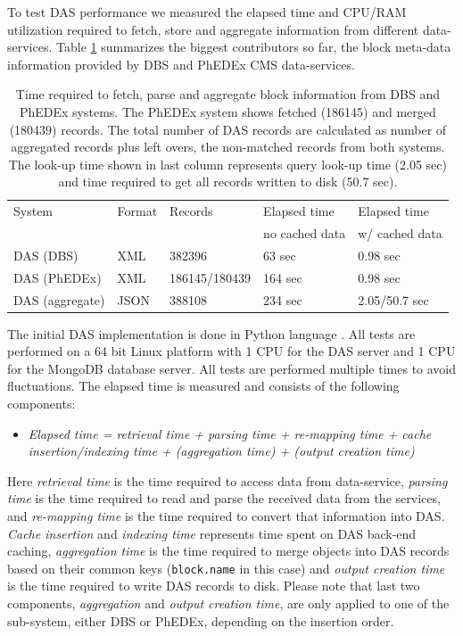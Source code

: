 \documentclass[1p,times]{elsarticle}
\begin{document}
To test DAS performance we measured the elapsed time and CPU/RAM utilization
required to fetch, store and aggregate information from different
data-services. Table \ref{DAS_benchmark} summarizes the biggest 
contributors so far, the block meta-data information provided by DBS and 
PhEDEx CMS data-services. 

\begin{table}[hbt]
\centering
\begin{tabular}{lllll}\hline
\hline
System & Format & Records & Elapsed time & Elapsed time \\
& & & no cached data & w/ cached data \\
\hline
DAS (DBS) & XML & 382396 & 63 sec & 0.98 sec \\
DAS (PhEDEx) & XML & 186145/180439 & 164 sec & 0.98 sec \\
DAS (aggregate) & JSON & 388108 & 234 sec & 2.05/50.7 sec \\
\hline
\hline
\end{tabular}
\caption{Time required to fetch, parse and aggregate block information
from DBS and PhEDEx systems. The PhEDEx
system shows fetched (186145) and merged (180439) records. 
The total number of DAS records are calculated as number of 
aggregated records plus left overs, the non-matched records from both systems. 
The look-up time shown in last column represents query look-up 
time (2.05 sec) and time required to get all records written 
to disk (50.7 sec).}
\label{DAS_benchmark}
\end{table}

The initial DAS implementation is done in Python language \cite{Python}.
All tests are performed on a 64 bit Linux platform with
1 CPU for the DAS server and 1 CPU for the MongoDB database server. 
All tests are performed multiple times to avoid fluctuations. 
The elapsed time is measured and consists of the following components:
\begin{itemize}
\item[]
{\it
Elapsed time = retrieval time + parsing time + re-mapping time 
        + cache insertion/indexing time 
        + (aggregation time) + (output creation time)
}
\end{itemize}
Here {\it retrieval time} is the time required to access data from data-service,
{\it parsing time} is the time required to read and parse the received data
from the services, and {\it re-mapping time} is the time required to convert 
that information into DAS. {\it Cache insertion} and {\it indexing time} 
represents time spent on DAS back-end caching, {\it aggregation time} is
the time required to merge objects into DAS records based
on their common keys (\verb+block.name+ in this case) and {\it output creation time}
is the time required to write DAS records to disk. Please note that last two
components, {\it aggregation} and {\it output creation time}, are only applied to
one of the sub-system, either DBS or PhEDEx, depending on the insertion order.
\end{document}
